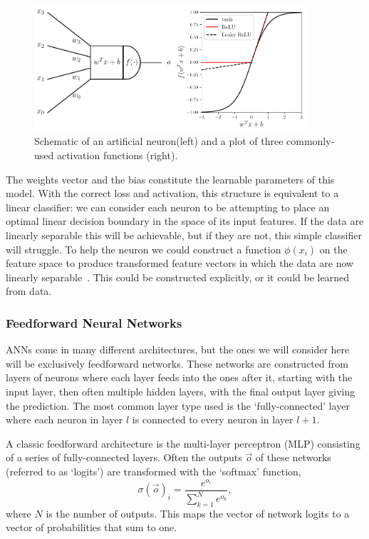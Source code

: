 \begin{figure}[h!]
    \begin{center}
        \includegraphics[width=0.9\textwidth]{figures/machine_learning/neuron_and_activation.pdf}
    \end{center}
    \caption{Schematic of an artificial neuron(left) and a plot of three commonly-used activation functions (right).}
        \label{fig:machine_learning:neuron_and_activation}
\end{figure}

The weights vector and the bias constitute the learnable parameters of this model. 
With the correct loss and activation, this structure is equivalent to a linear classifier: we can consider each neuron to be attempting to place an optimal linear decision boundary in the space of its input features. 
If the data are linearly separable this will be achievable, but if they are not, this simple classifier will struggle. 
To help the neuron we could construct a function $\phi(x_{i})$ on the feature space to produce transformed feature vectors in which the data are now linearly separable~\cite{DeepLearningBook}. 
This could be constructed explicitly, or it could be learned from data. 



\subsubsection{Feedforward Neural Networks}
ANNs come in many different architectures, but the ones we will consider here will be exclusively feedforward networks. 
These networks are constructed from layers of neurons where each layer feeds into the ones after it, starting with the input layer, then often multiple hidden layers, with the final output layer giving the prediction. 
The most common layer type used is the `fully-connected' layer where each neuron in layer $l$ is connected to every neuron in layer $l+1$. 

A classic feedforward architecture is the multi-layer perceptron (MLP) consisting of a series of fully-connected layers. Often the outputs $\vec{o}$ of these networks (referred to as `logits') are transformed with the `softmax' function,
\begin{equation}
    \sigma(\vec{o})_{i} = \frac{e^{o_{i}}}{\sum_{k=1}^{N}e^{o_{k}}},
\end{equation}
where $N$ is the number of outputs. 
This maps the vector of network logits to a vector of probabilities that sum to one.

